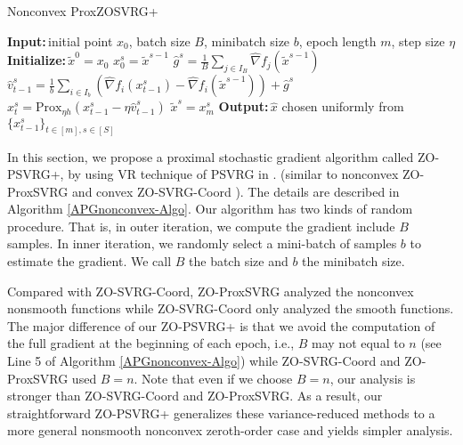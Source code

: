 \documentclass{article}
\newcommand*{\Po}{\text{Prox}}
\newcommand{\Initialize}{\textbf{Initialize:}{\,}}
\newcommand{\Input}{\textbf{Input:}{\,}}
\newcommand{\Output}{\textbf{Output:}{\,}}
\theoremstyle{definition}
\theoremstyle{remark}
\begin{document}
\begin{algorithm}\label{APGnonconvex-Algo}
\caption{Nonconvex ProxZOSVRG+}
\begin{algorithmic}[1]
\State\Input initial point $x_0$, batch size $B$, minibatch size $b$, epoch length $m$, step size $\eta$
\State\Initialize $\tilde{x}^0 = x_0$
\State $x_0^s = \widetilde{x}^{s-1}$
\State $\hat{g}^s = \frac{1}{B} \sum_{j\in I_B} \hat{\nabla} f_j (\widetilde{x}^{s-1})$
\State ${\hat{v}}_{t-1}^s = \frac{1}{b} \sum_{i\in I_b}\left(\hat{\nabla} f_{i}(x_{t-1}^s)-\hat{\nabla} f_{i}(\tilde{x}^{s-1})\right)+\hat{g}^s$
\State $x_{t}^s= \Po_{\eta h}(x_{t-1}^s - \eta \hat{v}_{t-1}^s)$
\EndFor
\State $\widetilde{x}^{s} = x_m^s$
 \EndFor
 \State\Output $\hat{x}$ chosen uniformly from $\{x_{t-1}^s\}_{t\in [m], s\in [S]}$
\end{algorithmic}
\end{algorithm}
{\color{Violet}
In this section, we propose a proximal stochastic gradient algorithm called ZO-PSVRG+, by using VR technique of PSVRG in \cite{xiao2014proximal,reddi2016proximal,li2018simple}.
(similar to nonconvex ZO-ProxSVRG \cite{} and convex ZO-SVRG-Coord \cite{}). The details
are described in Algorithm \ref{APGnonconvex-Algo}.
{\color{Brown}
Our algorithm has two kinds of random procedure. That is, in outer iteration,
we compute the gradient include $B$ samples. In inner iteration, we randomly select a mini-batch of samples $b$ to estimate the gradient.}
 We call $B$ the batch size and $b$ the minibatch size.

Compared with ZO-SVRG-Coord, ZO-ProxSVRG analyzed the nonconvex nonsmooth functions while ZO-SVRG-Coord only analyzed the smooth functions. The major difference of our ZO-PSVRG+ is that
we avoid the computation of the full gradient at the beginning of each epoch, i.e., $B$ may not equal to $n$ (see Line 5 of Algorithm \ref{APGnonconvex-Algo}) while ZO-SVRG-Coord and ZO-ProxSVRG used $B = n$. Note that even if we choose $B = n$, our analysis is
stronger than ZO-SVRG-Coord and ZO-ProxSVRG. As a result, our straightforward ZO-PSVRG+ generalizes these variance-reduced methods to a more general nonsmooth nonconvex zeroth-order case and yields simpler analysis.
}
\end{document}

